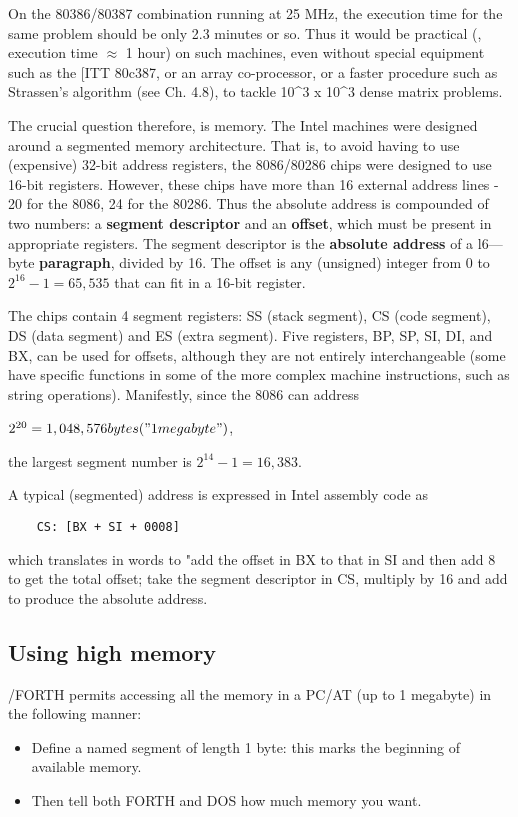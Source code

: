 {{On the 80386/80387 combination running at 25 MHz, the execution time for the same problem should be only 2.3 minutes or so. Thus it would be practical (\ie, execution time $\approx$ 1 hour) on such machines, even without special equipment such as the [ITT 80c387, or an array co-processor, or a faster procedure such as Strassen's algorithm (see Ch. 4.8), to tackle 10^{3} x 10^{3} dense matrix problems.

The crucial question therefore, is memory. The Intel machines were designed around a segmented memory architecture. That is, to avoid having to use (expensive) 32-bit address registers, the 8086/80286 chips were designed to use 16-bit registers. However, these chips have more than 16 external address lines - 20 for the 8086, 24 for the 80286. Thus the absolute address is compounded of two numbers: a \textbf{segment descriptor} and an \textbf{offset}, which must be present in appropriate registers. The segment descriptor is the \textbf{absolute address} of a l6—byte \textbf{paragraph}, divided by 16. The offset is any (unsigned) integer from 0 to $2^{16}-1 = 65,535$ that can fit in a 16-bit register.

The chips contain 4 segment registers: SS (stack segment), CS (code segment), DS (data segment) and ES (extra segment). Five registers, BP, SP, SI, DI, and BX, can be used for offsets, although they are not entirely interchangeable (some have specific functions in some of the more complex machine instructions, such as string operations). Manifestly, since the 8086 can address

$2^{20} = 1,048,576 bytes ("1 megabyte")$,

the largest segment number is $2^{14}-1 = 16,383$.

A typical (segmented) address is expressed in Intel assembly code
as

\begin{lstlisting}
    CS: [BX + SI + 0008]
\end{lstlisting}

which translates in words to "add the offset in BX to that in SI and then add 8 to get the total offset; take the segment descriptor in CS, multiply by 16 and add to produce the absolute address.

\subsection{Using high memory}
/FORTH permits accessing all the memory in a PC/AT (up
to 1 megabyte) in the following manner:
\begin{itemize}
    \item Define a named segment of length 1 byte: this marks the beginning of available memory.
    \item Then tell both FORTH and DOS how much memory you want.
\end{itemize} 

}}

